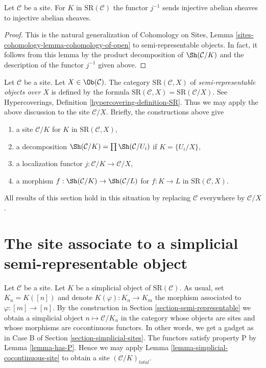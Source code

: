 \begin{lemma}
\label{lemma-localize-injective}
Let $\mathcal{C}$ be a site. For $K$ in $\text{SR}(\mathcal{C})$
the functor $j^{-1}$ sends injective abelian sheaves to injective
abelian sheaves.
\end{lemma}

\begin{proof}
This is the natural generalization of
Cohomology on Sites, Lemma
\ref{sites-cohomology-lemma-cohomology-of-open}
to semi-representable objects.
In fact, it follows from this lemma
by the product decomposition of $\Sh(\mathcal{C}/K)$
and the description of the functor $j^{-1}$ given above.
\end{proof}

\begin{remark}
\label{remark-semi-representable-over-object}
Let $\mathcal{C}$ be a site. Let $X \in \Ob(\mathcal{C})$.
The category $\text{SR}(\mathcal{C}, X)$
of {\it semi-representable objects over $X$}
is defined by the formula
$\text{SR}(\mathcal{C}, X) = \text{SR}(\mathcal{C}/X)$.
See Hypercoverings, Definition \ref{hypercovering-definition-SR}.
Thus we may apply the above discussion to the site
$\mathcal{C}/X$. Briefly, the constructions above give
\begin{enumerate}
\item a site $\mathcal{C}/K$ for $K$ in $\text{SR}(\mathcal{C}, X)$,
\item a decomposition
$\Sh(\mathcal{C}/K) = \prod \Sh(\mathcal{C}/U_i)$ if $K = \{U_i/X\}$,
\item a localization functor $j : \mathcal{C}/K \to \mathcal{C}/X$,
\item a morphism $f : \Sh(\mathcal{C}/K) \to \Sh(\mathcal{C}/L)$
for $f : K \to L$ in $\text{SR}(\mathcal{C}, X)$.
\end{enumerate}
All results of this section hold in this situation by replacing
$\mathcal{C}$ everywhere by $\mathcal{C}/X$.
\end{remark}






\section{The site associate to a simplicial semi-representable object}
\label{section-simplicial-semi-representable}

\noindent
Let $\mathcal{C}$ be a site. Let $K$ be a simplicial object of
$\text{SR}(\mathcal{C})$. As usual, set $K_n = K([n])$ and denote
$K(\varphi) : K_n \to K_m$ the morphism associated to $\varphi : [m] \to [n]$.
By the construction in
Section \ref{section-semi-representable} we obtain a simplicial object
$n \mapsto \mathcal{C}/K_n$ in the category whose objects are sites and
whose morphisms are cocontinuous functors. In other words, we get
a gadget as in Case B of Section \ref{section-simplicial-sites}.
The functors satisfy property P by Lemma \ref{lemma-has-P}.
Hence we may apply
Lemma \ref{lemma-simplicial-cocontinuous-site}
to obtain a site $(\mathcal{C}/K)_{total}$.


